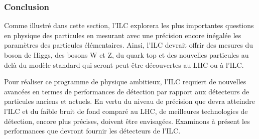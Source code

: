 %  
  
  \subsubsection{Conclusion}
  
  Comme illustr\'e dans cette section, l'ILC explorera les plus importantes questions en physique des particules en mesurant avec une pr\'ecision encore in\'egal\'ee les param\`etres des particules \'el\'ementaires. Ainsi, l'ILC devrait offrir des mesures du boson de Higgs, des bosons W et Z, du quark top et des nouvelles particules au delà du mod\`ele standard qui seront peut-\^etre d\'ecouvertes au LHC ou \`a l'ILC.
  
  \medskip
  
  Pour r\'ealiser ce programme de physique ambitieux, l'ILC requiert de nouvelles avanc\'ees en termes de performances de d\'etection par rapport aux détecteurs de particules anciens et actuels. En vertu du niveau de pr\'ecision que devra atteindre l'ILC et du faible bruit de fond compar\'e au LHC, de meilleures technologies de d\'etection, encore plus pr\'ecises, doivent \^etre envisag\'ees. Examinons \`a pr\'esent les performances que devront fournir les d\'etecteurs de l'ILC.
  
%   
  
